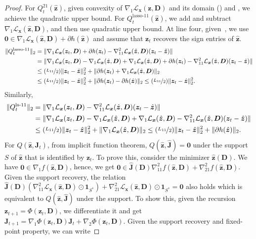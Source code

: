 \documentclass[10pt]{article} %
\newcommand{\D}{{\bm D}}
\newcommand{\J}{{\bm J}}
\newcommand{\x}{{\bm x}}
\newcommand{\z}{{\bm z}}
\newcommand{\zero}{{\bm 0}}
\newcommand{\Loss}{\mathcal{L}}
\begin{document}
%
\begin{proof}
For $Q_t^{21}(\hat \z)$, given convexity of $\nabla_1 \Loss_{\x}(\z, \D)$ and its domain () and , we achieve the quadratic upper bound. For $Q_t^{\text{lasso-}11}(\hat \z)$, we add and subtract $\nabla_1\Loss_{\x}(\hat \z, \D)$, and then use quadratic upper bound. At line four, given~, we use $\zero \in \nabla_1 \Loss_{\x}(\hat \z, \D) + \partial h(\hat \z)$ and assume that $\z_t$ recovers the sign entries of $\hat \z$.
\begin{equation}
\begin{aligned}
\| Q_t^{\text{lasso-}11} \|_2 &= \| \nabla_1 \Loss_{\x}(\z_t, \D) + \partial h(\z_t) - \nabla_{11}^2\Loss_{\x}(\hat \z, \D) (\z_t - \hat \z) \|\\
&= \| \nabla_1 \Loss_{\x}(\z_t, \D) - \nabla_1\Loss_{\x}(\hat \z, \D)  + \nabla_1\Loss_{\x}(\hat \z, \D) + \partial h(\z_t) - \nabla_{11}^2\Loss_{\x}(\hat \z, \D) (\z_t - \hat \z) \|\\
&\leq (\nicefrac{L_{11}}{2}) \| \z_t - \hat \z \|_2^2 + \| \partial h(\z_t) + \nabla_1\Loss_{\x}(\hat \z, \D) \|_2\\
&\leq (\nicefrac{L_{11}}{2}) \| \z_t - \hat \z \|_2^2 + \| \partial h(\z_t) - \partial h(\hat \z)  \|_2
\leq  (\nicefrac{L_{11}}{2}) \| \z_t - \hat \z \|_2^2.
\end{aligned}
\end{equation}
%
Similarly,
\begin{equation}
\begin{aligned}
\| Q_t^{\text{ls-}11} \|_2 &= \| \nabla_1 \Loss_{\x}(\z_t, \D) - \nabla_{11}^2\Loss_{\x}(\hat \z, \D) (\z_t - \hat \z) \|\\
&= \| \nabla_1 \Loss_{\x}(\z_t, \D) - \nabla_1\Loss_{\x}(\hat \z, \D)  + \nabla_1\Loss_{\x}(\hat \z, \D) - \nabla_{11}^2\Loss_{\x}(\hat \z, \D) (\z_t - \hat \z) \|\\
&\leq (\nicefrac{L_{11}}{2}) \| \z_t - \hat \z \|_2^2 + \| \nabla_1\Loss_{\x}(\hat \z, \D) \|_2
\leq (\nicefrac{L_{11}}{2}) \| \z_t - \hat \z \|_2^2 + \| \partial h(\hat \z) \|_2.
\end{aligned}
\end{equation}
%
For $Q(\hat \z, \J_t)$, from implicit function theorem, $Q(\hat \z, \hat \J) = \zero$ under the support $S$ of $\hat \z$ that is identified by $\z_t$. To prove this, consider the minimizer $\hat \z(\D)$. We have $\zero \in \nabla_1 f(\hat {\bm z}, {\bm D})$, hence, we get $\zero \in \hat {\J}({\D}) \nabla_{11}^2 f(\hat \z, \D) + \nabla_{21}^2 f(\hat \z, \D)$. Given the support recovery, the relation $\hat \J(\D) (\nabla_{11}^2 \Loss_{\x}(\hat \z, \D) \odot \mathbf{1}_{S^{\ast}}) + \nabla_{21}^2 \Loss_{\x}(\hat \z, \D) \odot \mathbf{1}_{S^{\ast}} = \zero$ also holds which is equivalent to $Q(\hat \z, \hat \J)$ under the support. To show this, given the recursion ${\z}_{t+1} = \Phi(\z_t, \D)$, we differentiate it and get $\J_{t+1} = \nabla_1 \Phi(\z_t, \D) \J_t + \nabla_2 \Phi(\z_t, \D)$. Given the support recovery and fixed-point property, we can write

\end{proof}
\end{document}
